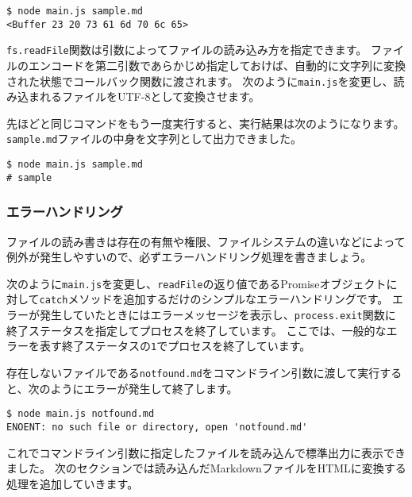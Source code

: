 \begin{lstlisting}
$ node main.js sample.md
<Buffer 23 20 73 61 6d 70 6c 65>
\end{lstlisting}

\texttt{fs.readFile}関数は引数によってファイルの読み込み方を指定できます。
ファイルのエンコードを第二引数であらかじめ指定しておけば、自動的に文字列に変換された状態でコールバック関数に渡されます。
次のように\texttt{main.js}を変更し、読み込まれるファイルをUTF-8として変換させます。



先ほどと同じコマンドをもう一度実行すると、実行結果は次のようになります。
\texttt{sample.md}ファイルの中身を文字列として出力できました。

\begin{lstlisting}
$ node main.js sample.md
# sample
\end{lstlisting}

\hypertarget{error-handling}{%
\subsubsection{エラーハンドリング}\label{error-handling}}

ファイルの読み書きは存在の有無や権限、ファイルシステムの違いなどによって例外が発生しやすいので、必ずエラーハンドリング処理を書きましょう。

次のように\texttt{main.js}を変更し、\texttt{readFile}の返り値であるPromiseオブジェクトに対して\texttt{catch}メソッドを追加するだけのシンプルなエラーハンドリングです。
エラーが発生していたときにはエラーメッセージを表示し、\texttt{process.exit}関数に終了ステータスを指定してプロセスを終了しています。
ここでは、一般的なエラーを表す終了ステータスの\texttt{1}でプロセスを終了しています。



存在しないファイルである\texttt{notfound.md}をコマンドライン引数に渡して実行すると、次のようにエラーが発生して終了します。

\begin{lstlisting}
$ node main.js notfound.md
ENOENT: no such file or directory, open 'notfound.md'
\end{lstlisting}

これでコマンドライン引数に指定したファイルを読み込んで標準出力に表示できました。
次のセクションでは読み込んだMarkdownファイルをHTMLに変換する処理を追加していきます。

